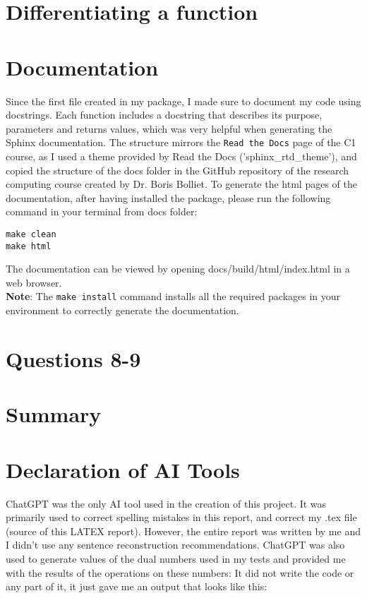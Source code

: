 \documentclass[a4paper,12pt]{article}
\begin{document}
\section{Differentiating a function}
\section{Documentation}
Since the first file created in my package, I made sure to document my code using docstrings. Each function includes a docstring that describes its purpose, parameters and returns values, which was very helpful when generating the Sphinx documentation. The structure mirrors the \texttt{Read the Docs} page of the C1 course, as I used a theme provided by Read the Docs ('sphinx\_rtd\_theme'), and copied the structure of the docs folder in the GitHub repository of the research computing course created by Dr. Boris Bolliet. 
To generate the html pages of the documentation, after having installed the package,  please run the following command in your terminal from docs folder:
\begin{verbatim}
make clean
make html
\end{verbatim}
The documentation can be viewed by opening docs/build/html/index.html in a web browser.
\\

\textbf{Note}: The \texttt{make install} command installs all the required packages in your environment to correctly generate the documentation.
\\
\section{Questions 8-9}
\section{Summary}
\section{Declaration of AI Tools}
ChatGPT was the only AI tool used in the creation of this project. It was primarily used to correct spelling mistakes in this report, and correct my .tex file (source of this LATEX report). However, the entire report was written by me and I didn’t use any sentence reconstruction recommendations. ChatGPT was also used to generate values of the dual numbers used in my tests and provided me with the results of the operations on these numbers: It did not write the code or any part of it, it just gave me an output that looks like this: 
\\
\end{document}
